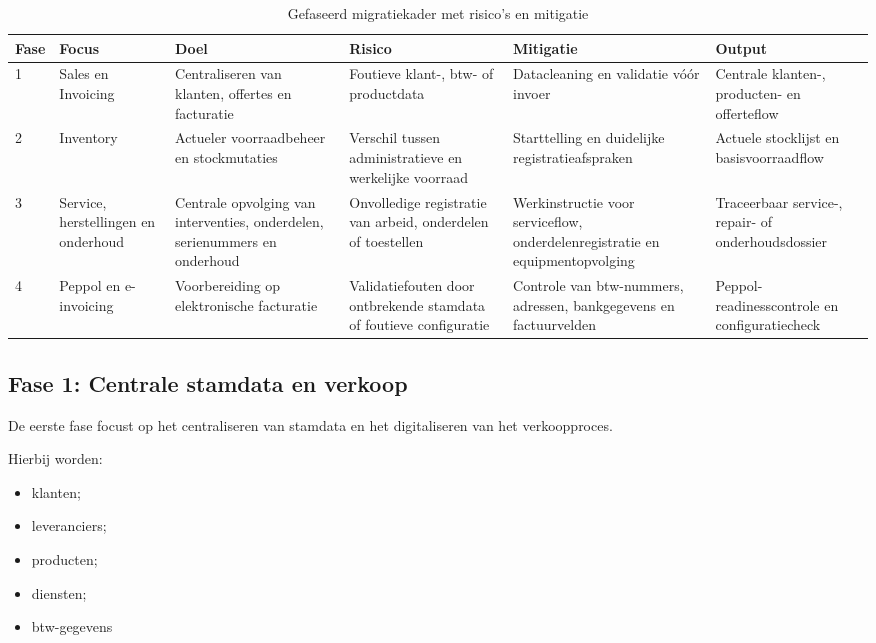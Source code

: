 \begin{table}[H]
\centering
\small
\caption{Gefaseerd migratiekader met risico's en mitigatie}
\label{tab:migratiefases}
\begin{tabular}{|p{0.8cm}|p{1.9cm}|p{2.7cm}|p{2.5cm}|p{2.6cm}|p{2.6cm}|}
\hline
\textbf{Fase} & \textbf{Focus} & \textbf{Doel} & \textbf{Risico} & \textbf{Mitigatie} & \textbf{Output} \\
\hline
1 & Sales en Invoicing & Centraliseren van klanten, offertes en facturatie & Foutieve klant-, btw- of productdata & Datacleaning en validatie vóór invoer & Centrale klanten-, producten- en offerteflow \\
\hline
2 & Inventory & Actueler voorraadbeheer en stockmutaties & Verschil tussen administratieve en werkelijke voorraad & Starttelling en duidelijke registratieafspraken & Actuele stocklijst en basisvoorraadflow \\
\hline
3 & Service, herstellingen en onderhoud & Centrale opvolging van interventies, onderdelen, serienummers en onderhoud & Onvolledige registratie van arbeid, onderdelen of toestellen & Werkinstructie voor serviceflow, onderdelenregistratie en equipmentopvolging & Traceerbaar service-, repair- of onderhoudsdossier \\
\hline
4 & Peppol en e-invoicing & Voorbereiding op elektronische facturatie & Validatiefouten door ontbrekende stamdata of foutieve configuratie & Controle van btw-nummers, adressen, bankgegevens en factuurvelden & Peppol-readinesscontrole en configuratiecheck \\
\hline
\end{tabular}
\end{table}

\subsection{Fase 1: Centrale stamdata en verkoop}

De eerste fase focust op het centraliseren van stamdata en het digitaliseren van het verkoopproces.

Hierbij worden:
\begin{itemize}
    \item klanten;
    \item leveranciers;
    \item producten;
    \item diensten;
    \item btw-gegevens
\end{itemize}

